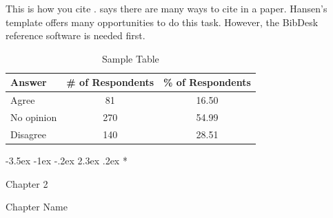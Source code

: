 \documentclass[12pt]{article}
\makeatletter
\renewcommand\section{\@startsection {section}{1}{\z@}%
                                   {-3.5ex \@plus -1ex \@minus -.2ex}%
                                   {2.3ex \@plus.2ex}%
                                   {\normalfont\scshape\bfseries\LARGE}}
\makeatother
\begin{document}
This is how you cite \citep{Hansen2014}. \citet{Hansen2014} says there are many ways to cite in a paper. Hansen's \citeyearpar{Hansen2014} template offers many opportunities to do this task. However, the BibDesk reference software is needed first. \\

\begin{table}[ht]
\caption{Sample Table}
\begin{center}
\begin{tabular}{|lcc|}
  \hline
Answer & \# of Respondents & \% of Respondents \\ 
  \hline
Agree & 81 & 16.50\\ 
  No opinion & 270 & 54.99 \\ 
  Disagree & 140 & 28.51\\ 
   \hline
\end{tabular}
\end{center}
\end{table}

\lipsum






\newpage
{}
\section*{Chapter 2 \\
\begin{flushright}
 Chapter Name
 \end{flushright}}
 \vspace{4cm}
\end{document}
